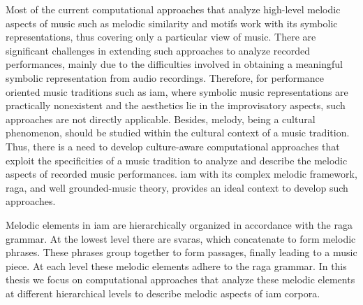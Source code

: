 Most of the current computational approaches that analyze high-level melodic aspects of music such as melodic similarity and motifs work with its symbolic representations, thus covering only a particular view of music. There are significant challenges in extending such approaches to analyze recorded performances, mainly due to the difficulties involved in obtaining a meaningful symbolic representation from audio recordings. Therefore, for performance oriented music traditions such as \gls{iam}, where symbolic music representations are practically nonexistent and the aesthetics lie in the improvisatory aspects, such approaches are not directly applicable. Besides, melody, being a cultural phenomenon, should be studied within the cultural context of a music tradition. Thus, there is a need to develop culture-aware computational approaches that exploit the specificities of a music tradition to analyze and describe the melodic aspects of recorded music performances. \gls{iam} with its complex melodic framework, \gls{raga}, and well grounded-music theory, provides an ideal context to develop such approaches.

Melodic elements in \gls{iam} are hierarchically organized in accordance with the \gls{raga} grammar. At the lowest level there are \glspl{svara}, which concatenate to form melodic phrases. These phrases group together to form passages, finally leading to a music piece. At each level these melodic elements adhere to the \gls{raga} grammar. In this thesis we focus on computational approaches that analyze these melodic elements at different hierarchical levels to describe melodic aspects of \gls{iam} corpora. 

